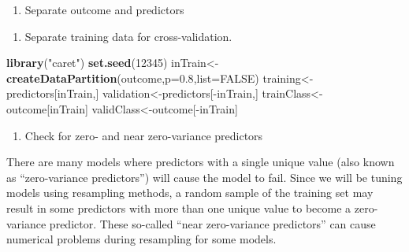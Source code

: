 \documentclass[]{article}
\newenvironment{Shaded}{\begin{snugshade}}{\end{snugshade}}
\newcommand{\KeywordTok}[1]{\textcolor[rgb]{0.13,0.29,0.53}{\textbf{{#1}}}}
\newcommand{\DataTypeTok}[1]{\textcolor[rgb]{0.13,0.29,0.53}{{#1}}}
\newcommand{\DecValTok}[1]{\textcolor[rgb]{0.00,0.00,0.81}{{#1}}}
\newcommand{\FloatTok}[1]{\textcolor[rgb]{0.00,0.00,0.81}{{#1}}}
\newcommand{\StringTok}[1]{\textcolor[rgb]{0.31,0.60,0.02}{{#1}}}
\newcommand{\OtherTok}[1]{\textcolor[rgb]{0.56,0.35,0.01}{{#1}}}
\newcommand{\NormalTok}[1]{{#1}}
\begin{document}
\begin{enumerate}
\def\labelenumi{\arabic{enumi}.}
\itemsep1pt\parskip0pt
\item
  Separate outcome and predictors
\end{enumerate}

\begin{Shaded}
\end{Shaded}

\begin{enumerate}
\def\labelenumi{\arabic{enumi}.}
\setcounter{enumi}{1}
\itemsep1pt\parskip0pt
\item
  Separate training data for cross-validation.
\end{enumerate}

\begin{Shaded}
\begin{Highlighting}[]
\KeywordTok{library}\NormalTok{(}\StringTok{"caret"}\NormalTok{)}
\KeywordTok{set.seed}\NormalTok{(}\DecValTok{12345}\NormalTok{)}
\NormalTok{inTrain<-}\KeywordTok{createDataPartition}\NormalTok{(outcome,}\DataTypeTok{p=}\FloatTok{0.8}\NormalTok{,}\DataTypeTok{list=}\OtherTok{FALSE}\NormalTok{)}
\NormalTok{training<-predictors[inTrain,]}
\NormalTok{validation<-predictors[-inTrain,]}
\NormalTok{trainClass<-outcome[inTrain]}
\NormalTok{validClass<-outcome[-inTrain]}
\end{Highlighting}
\end{Shaded}

\begin{enumerate}
\def\labelenumi{\arabic{enumi}.}
\setcounter{enumi}{2}
\itemsep1pt\parskip0pt
\item
  Check for zero- and near zero-variance predictors
\end{enumerate}

There are many models where predictors with a single unique value (also
known as ``zero-variance predictors'') will cause the model to fail.
Since we will be tuning models using resampling methods, a random sample
of the training set may result in some predictors with more than one
unique value to become a zero-variance predictor. These so-called ``near
zero-variance predictors'' can cause numerical problems during
resampling for some models.
\end{document}
